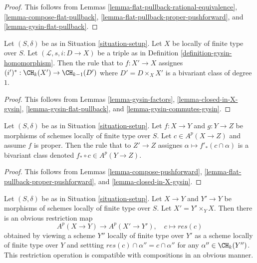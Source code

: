\begin{proof}
This follows from
Lemmas \ref{lemma-flat-pullback-rational-equivalence},
\ref{lemma-compose-flat-pullback},
\ref{lemma-flat-pullback-proper-pushforward}, and
\ref{lemma-gysin-flat-pullback}.
\end{proof}

\begin{lemma}
\label{lemma-gysin-bivariant}
Let $(S, \delta)$ be as in Situation \ref{situation-setup}.
Let $X$ be locally of finite type over $S$.
Let $(\mathcal{L}, s, i : D \to X)$ be a triple as in
Definition \ref{definition-gysin-homomorphism}.
Then the rule that to $f : X' \to X$ assignes
$(i')^* : \CH_k(X') \to \CH_{k - 1}(D')$ where $D' = D \times_X X'$
is a bivariant class of degree $1$.
\end{lemma}

\begin{proof}
This follows from Lemmas \ref{lemma-gysin-factors},
\ref{lemma-closed-in-X-gysin},
\ref{lemma-gysin-flat-pullback}, and
\ref{lemma-gysin-commutes-gysin}.
\end{proof}

\begin{lemma}
\label{lemma-push-proper-bivariant}
Let $(S, \delta)$ be as in Situation \ref{situation-setup}.
Let $f : X \to Y$ and $g : Y \to Z$ be morphisms of
schemes locally of finite type over $S$.
Let $c \in A^p(X \to Z)$ and assume $f$ is proper.
Then the rule that to $Z' \to Z$ assignes
$\alpha \longmapsto f'_*(c \cap \alpha)$
is a bivariant class denoted $f_* \circ c \in A^p(Y \to Z)$.
\end{lemma}

\begin{proof}
This follows from Lemmas \ref{lemma-compose-pushforward},
\ref{lemma-flat-pullback-proper-pushforward}, and
\ref{lemma-closed-in-X-gysin}.
\end{proof}

\begin{remark}
\label{remark-restriction-bivariant}
Let $(S, \delta)$ be as in Situation \ref{situation-setup}. Let $X \to Y$
and $Y' \to Y$ be morphisms of schemes locally of finite type over $S$.
Let $X' = Y' \times_Y X$. Then there is an obvious restriction map
$$
A^p(X \to Y) \longrightarrow A^p(X' \to Y'),\quad
c \longmapsto res(c)
$$
obtained by viewing a scheme $Y''$ locally of finite type over $Y'$
as a scheme locally of finite type over $Y$ and settting
$res(c) \cap \alpha'' = c \cap \alpha''$ for any $\alpha'' \in \CH_k(Y'')$.
This restriction operation is compatible with compositions in an
obvious manner.
\end{remark}

